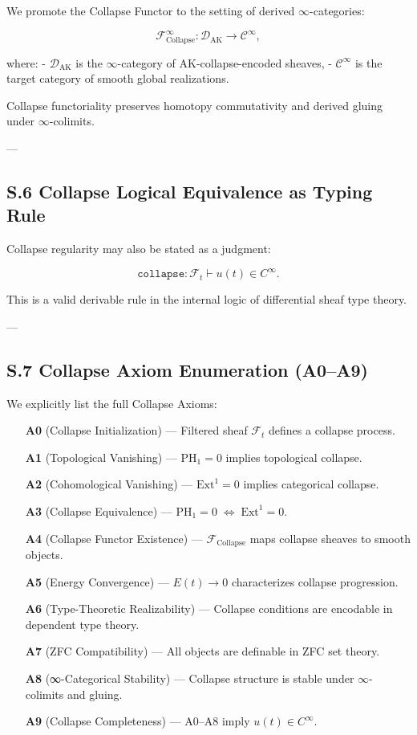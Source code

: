 \documentclass[11pt]{article}
\begin{document}
{We promote the Collapse Functor to the setting of derived $\infty$-categories:

\[
\mathcal{F}_{\mathrm{Collapse}}^\infty : \mathcal{D}_{\mathrm{AK}} \longrightarrow \mathcal{C}^\infty,
\]

where:
- $\mathcal{D}_{\mathrm{AK}}$ is the $\infty$-category of AK-collapse-encoded sheaves,
- $\mathcal{C}^\infty$ is the target category of smooth global realizations.

Collapse functoriality preserves homotopy commutativity and derived gluing under $\infty$-colimits.

---

\subsection*{S.6 Collapse Logical Equivalence as Typing Rule}

Collapse regularity may also be stated as a judgment:

\[
\texttt{collapse} : \mathcal{F}_t \vdash u(t) \in C^\infty.
\]

This is a valid derivable rule in the internal logic of differential sheaf type theory.

---

\subsection*{S.7 Collapse Axiom Enumeration (A0–A9)}

We explicitly list the full Collapse Axioms:

\begin{itemize}
  \item[\textbf{A0}] (Collapse Initialization) — Filtered sheaf $\mathcal{F}_t$ defines a collapse process.
  \item[\textbf{A1}] (Topological Vanishing) — $\mathrm{PH}_1 = 0$ implies topological collapse.
  \item[\textbf{A2}] (Cohomological Vanishing) — $\mathrm{Ext}^1 = 0$ implies categorical collapse.
  \item[\textbf{A3}] (Collapse Equivalence) — $\mathrm{PH}_1 = 0 \;\Leftrightarrow\; \mathrm{Ext}^1 = 0$.
  \item[\textbf{A4}] (Collapse Functor Existence) — $\mathcal{F}_{\mathrm{Collapse}}$ maps collapse sheaves to smooth objects.
  \item[\textbf{A5}] (Energy Convergence) — $E(t) \to 0$ characterizes collapse progression.
  \item[\textbf{A6}] (Type-Theoretic Realizability) — Collapse conditions are encodable in dependent type theory.
  \item[\textbf{A7}] (ZFC Compatibility) — All objects are definable in ZFC set theory.
  \item[\textbf{A8}] (∞-Categorical Stability) — Collapse structure is stable under $\infty$-colimits and gluing.
  \item[\textbf{A9}] (Collapse Completeness) — A0–A8 imply $u(t) \in C^\infty$.
\end{itemize}

}
\end{document}
